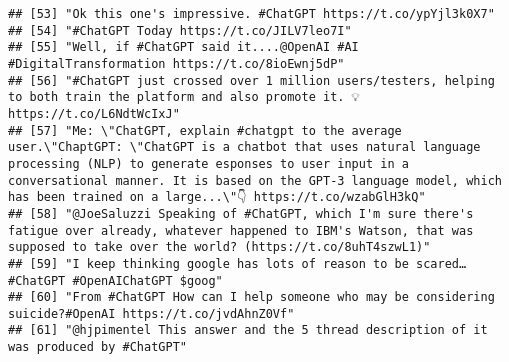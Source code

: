 \documentclass[
]{article}
\begin{document}
\begin{verbatim}
## [53] "Ok this one's impressive. #ChatGPT https://t.co/ypYjl3k0X7"                                                                                                                                                                                                                                                    
## [54] "#ChatGPT Today https://t.co/JILV7leo7I"                                                                                                                                                                                                                                                                        
## [55] "Well, if #ChatGPT said it....@OpenAI #AI #DigitalTransformation https://t.co/8ioEwnj5dP"                                                                                                                                                                                                                       
## [56] "#ChatGPT just crossed over 1 million users/testers, helping to both train the platform and also promote it. 💡 https://t.co/L6NdtWcIxJ"                                                                                                                                                                        
## [57] "Me: \"ChatGPT, explain #chatgpt to the average user.\"ChaptGPT: \"ChatGPT is a chatbot that uses natural language processing (NLP) to generate esponses to user input in a conversational manner. It is based on the GPT-3 language model, which has been trained on a large...\"👇 https://t.co/wzabGlH3kQ"   
## [58] "@JoeSaluzzi Speaking of #ChatGPT, which I'm sure there's fatigue over already, whatever happened to IBM's Watson, that was supposed to take over the world? (https://t.co/8uhT4szwL1)"                                                                                                                         
## [59] "I keep thinking google has lots of reason to be scared… #ChatGPT #OpenAIChatGPT $goog"                                                                                                                                                                                                                         
## [60] "From #ChatGPT How can I help someone who may be considering suicide?#OpenAI https://t.co/jvdAhnZ0Vf"                                                                                                                                                                                                           
## [61] "@hjpimentel This answer and the 5 thread description of it was produced by #ChatGPT"                                                                                                                                                                                                                           

\end{verbatim}
\end{document}
